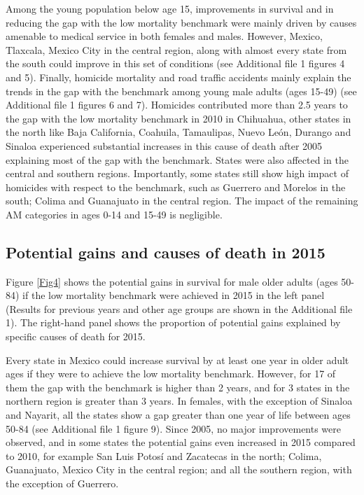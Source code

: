\documentclass{bmcart}
\begin{document}
Among the young population below age 15, improvements in survival and in reducing the gap with the low mortality benchmark were mainly driven by causes amenable to medical service in both females and males. However,  Mexico, Tlaxcala, Mexico City in the central region, along with almost every state from the south could improve in this set of conditions (see Additional file 1 figures 4 and 5). Finally, homicide mortality and road traffic accidents mainly explain the trends in the gap with the benchmark among young male adults (ages 15-49) (see Additional file 1 figures 6 and 7). Homicides contributed more than 2.5 years to the gap with the low mortality benchmark in 2010 in Chihuahua, other states in the north like Baja California, Coahuila, Tamaulipas, Nuevo Le\'on, Durango and Sinaloa experienced substantial increases in this cause of death after 2005 explaining most of the gap with the benchmark. States were also affected in the central and southern regions. Importantly, some states still show high impact of homicides with respect to the benchmark, such as Guerrero and Morelos in the south; Colima and Guanajuato in the central region.
The impact of the remaining  AM categories in ages 0-14 and 15-49 is negligible. \\

\subsection*{Potential gains and causes of death in 2015}

Figure \ref{Fig4} shows the potential gains in survival for male older adults (ages 50-84)  if the low mortality benchmark were achieved in 2015 in the left panel (Results for previous years and other age groups are shown in the Additional file 1). The right-hand panel shows the proportion of potential gains explained by specific causes of death for 2015.

Every state in Mexico could increase survival by at least one year in older adult ages if they were to achieve the low mortality benchmark. However, for 17 of them the gap with the benchmark is higher than 2 years, and for 3 states in the northern region is greater than 3 years. In females, with the exception of Sinaloa and Nayarit, all the states show a gap greater than one year of life between ages 50-84 (see Additional file 1 figure 9). Since 2005, no major improvements were observed, and in some states the potential gains even increased in 2015 compared to 2010, for example San Luis Potos\'i and Zacatecas in the north; Colima, Guanajuato, Mexico City in the central region; and all the southern region, with the exception of Guerrero. 
\end{document}
